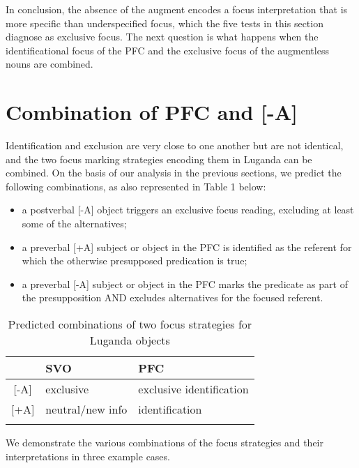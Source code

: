 \documentclass[output=paper]{langsci/langscibook}
\begin{document}
  In conclusion, the absence of the augment encodes a focus interpretation that is more specific than  underspecified focus, which the five tests in this section diagnose as exclusive focus. The next question is what happens when the identificational focus of the PFC and the exclusive focus of the augmentless nouns are combined.

\section{Combination of PFC and [-A]}\label{sec:vanderwal:5}
 
Identification and exclusion are very close to one another but are not identical, and the two focus marking strategies encoding them in Luganda can be combined. On the basis of our analysis in the previous sections, we predict the following combinations, as also represented in Table 1 below:

\begin{itemize}
 \item a postverbal [-A] object triggers an exclusive focus reading, excluding at least some of the alternatives;
 \item a preverbal [+A] subject or object in the PFC is identified as the referent for which the otherwise presupposed predication is true;
 \item a preverbal [-A] subject or object in the PFC marks the predicate as part of the presupposition AND excludes alternatives for the focused referent.
\end{itemize} 

\begin{table}
\caption{Predicted combinations of two focus strategies for Luganda objects}
\begin{tabular}{cll} 
\lsptoprule
& {{SVO}} & {{PFC}}\\ 
\midrule{}
[-A] & {\mdseries exclusive} & {\mdseries exclusive identification}\\{}
[+A] & {\mdseries neutral/new info} & {\mdseries identification}\\
\lspbottomrule
\end{tabular}
\end{table}

We demonstrate the various combinations of the focus strategies and their interpretations in three example cases.
\end{document}
